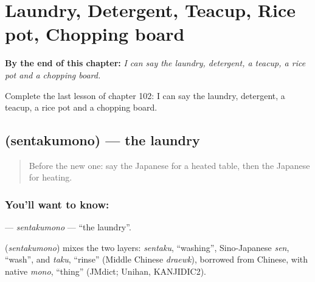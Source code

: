 
\chapter{Laundry, Detergent, Teacup, Rice pot, Chopping board}
\label{ch:ja-laundry-detergent-teacup-rice-pot-chopping-board}

\begin{chapteropening}
\textbf{By the end of this chapter:} \emph{I can say the laundry, detergent, a teacup, a rice pot and a chopping board.}

Complete the last lesson of chapter 102: I can say the laundry, detergent, a teacup, a rice pot and a chopping board.
\end{chapteropening}

\section[\texorpdfstring{\ja{せんたくもの} (sentakumono)}{せんたくもの (sentakumono)}]{ (sentakumono) — the laundry}

\label{lesson:JA-C102-sentakumono}



\begin{quote}
Before the new one: say the Japanese for a heated table, then the Japanese for heating.
\end{quote}

\subsection*{You'll want to know: }
\textbf{} — \emph{sentakumono} — \textquotedblleft{}the laundry\textquotedblright{}.

\begin{cousinweb}
\textbf{} (\emph{sentakumono}) mixes the two layers: \emph{sentaku}, \textquotedblleft{}washing\textquotedblright{}, Sino-Japanese \emph{sen}, \textquotedblleft{}wash\textquotedblright{}, and \emph{taku}, \textquotedblleft{}rinse\textquotedblright{} (Middle Chinese \emph{draewk}), borrowed from Chinese, with native \emph{mono}, \textquotedblleft{}thing\textquotedblright{} (JMdict; Unihan, KANJIDIC2).
\end{cousinweb}

